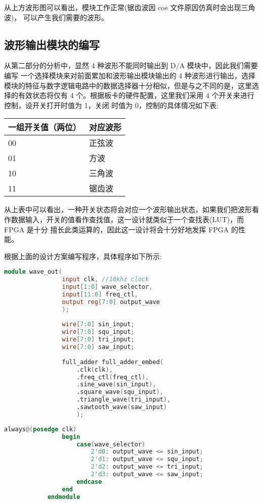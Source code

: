 {\begin{spacing}{1.5}
			从上方波形图可以看出，模块工作正常(锯齿波因 coe 文件原因仿真时会出现三角波)，
			可以产生我们需要的波形。
		\subsection{波形输出模块的编写}
			从第二部分的分析中，显然 4 种波形不能同时输出到 D/A 模块中，因此我们需要编写
			一个选择模块来对前面累加和波形输出模块输出的 4 种波形进行输出，选择模块的特征与数字逻辑电路中的数据选择器十分相似，但是与之不同的是，这里选择的有效状态将仅有 4 个。根据板卡的硬件配置，这里我们采用 4 个开关来进行控制，设开关打开时值为 1，关闭 时值为 0，控制的具体情况如下表:
			{\wuhao\songti
				\begin{table}[htb]
					\begin{center}
						\begin{tabular}{m{6cm} m{5cm}}
							\bottomrule
							一组开关值（两位） & 对应波形\\
							\hline
							00 & 正弦波 \\
							01 & 方波 \\
							10 & 三角波 \\
							11 & 锯齿波 \\
							\bottomrule
						\end{tabular}
					\end{center}
			\end{table}}
			从上表中可以看出，一种开关状态将会对应一个波形输出状态，如果我们把波形看作数据输入，开关的值看作查找值，这一设计就类似于一个查找表(LUT)，而 FPGA 是十分 擅长此类运算的，因此这一设计将会十分好地发挥 FPGA 的性能。

			根据上面的设计方案编写程序，具体程序如下所示:
			\begin{lstlisting}[language=Verilog]
			module wave_out(
				input clk, //10khz clock
				input[1:0] wave_selector,
				input[11:0] freq_ctl,
				output reg[7:0] output_wave
				);
			
				wire[7:0] sin_input;
				wire[7:0] squ_input;
				wire[7:0] tri_input;
				wire[7:0] saw_input;
			
				full_adder full_adder_embed(
					.clk(clk),
					.freq_ctl(freq_ctl),
					.sine_wave(sin_input),
					.square_wave(squ_input),
					.triangle_wave(tri_input),
					.sawtooth_wave(saw_input)
					);

			\end{lstlisting}
			\begin{lstlisting}[language=Verilog]
				always@(posedge clk)
				begin
					case(wave_selector)
						2'd0: output_wave <= sin_input;
						2'd1: output_wave <= squ_input;
						2'd2: output_wave <= tri_input;
						2'd3: output_wave <= saw_input;
					endcase
				end
			endmodule
			\end{lstlisting}


\end{spacing}}
